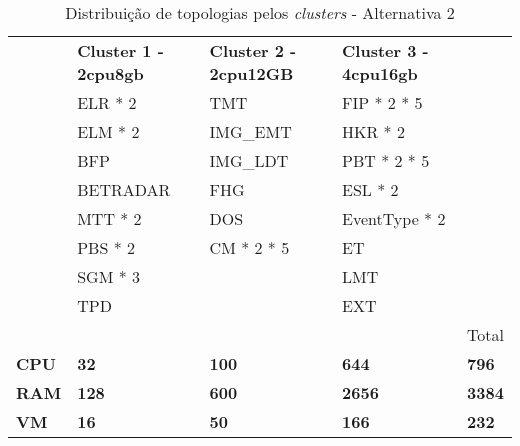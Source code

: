 \begin{table}[H]
  \centering
  \begin{tabular}{|l|l|l|l|l|}
    \hline
    \rowcolor[HTML]{FBE6A3} 
    \multicolumn{5}{|c|}{\textbf{Alternativa 2}} \\ \hline
    \rowcolor[HTML]{4EAC5B} 
    \cellcolor{white} & \textbf{Cluster 1 - 2cpu8gb} & \textbf{Cluster 2 - 2cpu12GB} & \textbf{Cluster 3 - 4cpu16gb} & \cellcolor{white} \\ \hline
    \cellcolor{white} & \cellcolor[HTML]{A9D08E} ELR * 2 & \cellcolor[HTML]{BDD7EE} TMT  & \cellcolor[HTML]{A9D08E} FIP * 2 * 5 & \cellcolor{white} \\ \hline
    \cellcolor{white} & \cellcolor[HTML]{A9D08E} ELM * 2 & \cellcolor[HTML]{BDD7EE} IMG\_EMT  & \cellcolor[HTML]{A9D08E} HKR * 2 & \cellcolor{white} \\ \hline
    \cellcolor{white} & \cellcolor[HTML]{A9D08E} BFP & \cellcolor[HTML]{BDD7EE} IMG\_LDT  & \cellcolor[HTML]{A9D08E} PBT * 2 * 5 & \cellcolor{white} \\ \hline
    \cellcolor{white} & \cellcolor[HTML]{A9D08E} BETRADAR & \cellcolor[HTML]{BDD7EE} FHG  & \cellcolor[HTML]{A9D08E} ESL * 2 &  \cellcolor{white} \\ \hline
    \cellcolor{white} & \cellcolor[HTML]{BDD7EE} MTT * 2 & \cellcolor[HTML]{BDD7EE} DOS  & \cellcolor[HTML]{A9D08E} EventType * 2 & \cellcolor{white} \\ \hline
    \cellcolor{white} & \cellcolor[HTML]{BDD7EE} PBS * 2 & \cellcolor[HTML]{BDD7EE} CM * 2 * 5  & \cellcolor[HTML]{BDD7EE} ET  & \cellcolor{white} \\ \hline
    \cellcolor{white} & \cellcolor[HTML]{BDD7EE} SGM * 3 & \cellcolor{white} & \cellcolor[HTML]{BDD7EE} LMT & \cellcolor{white} \\ \hline
    \cellcolor{white} & \cellcolor[HTML]{BDD7EE} TPD & \cellcolor{white} & \cellcolor[HTML]{BDD7EE} EXT & \cellcolor{white} \\ \hline
    \cellcolor{white} & \cellcolor{white} & \cellcolor{white} & \cellcolor{white} & Total \cellcolor{white} \\ \hline

    \rowcolor[HTML]{D9D9D9} 
    \textbf{CPU} & \textbf{32} & \textbf{100} & \textbf{644} & \textbf{796} \\ \hline
    \rowcolor[HTML]{D9D9D9} 
    \textbf{RAM} & \textbf{128} & \textbf{600} & \textbf{2656} & \textbf{3384} \\ \hline
    \rowcolor[HTML]{D9D9D9} 
    \textbf{VM} & \textbf{16} & \textbf{50} & \textbf{166} & \textbf{232} \\ \hline
  \end{tabular}
  \caption{Distribuição de topologias pelos \textit{clusters} - Alternativa 2}
  \label{tab:proposal-2}
\end{table}


